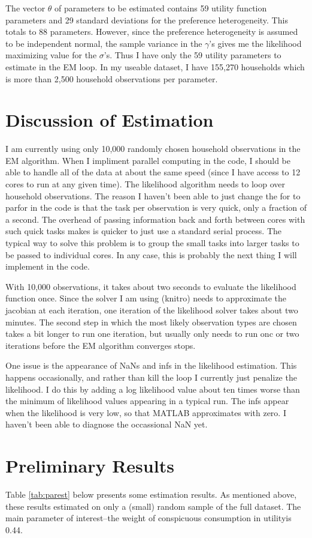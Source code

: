 \documentclass{article}
\begin{document}
The vector $\theta$ of parameters to be estimated contains 59 utility function parameters and 29 standard deviations for the preference heterogeneity.  
This totals to 88 parameters.  
However, since the preference heterogeneity is assumed to be independent normal, the sample variance in the $\gamma$'s gives me the likelihood maximizing value for the $\sigma$'s.
Thus I have only the 59 utility parameters to estimate in the EM loop. 
In my useable dataset, I have 155,270 households which is more than 2,500 household observations per parameter.
\section{Discussion of Estimation}
I am currently using only 10,000 randomly chosen household observations in the EM algorithm.
When I impliment parallel computing in the code, I should be able to handle all of the data at about the same speed (since I have access to 12 cores to run at any given time).
The likelihood algorithm needs to loop over household observations.
The reason I haven't been able to just change the for to parfor in the code is that the task per observation is very quick, only a fraction of a second.
The overhead of passing information back and forth between cores with such quick tasks makes is quicker to just use a standard serial process.
The typical way to solve this problem is to group the small tasks into larger tasks to be passed to individual cores.  
In any case, this is probably the next thing I will implement in the code.

With 10,000 observations, it takes about two seconds to evaluate the likelihood function once.
Since the solver I am using (knitro) needs to approximate the jacobian at each iteration, one iteration of the likelihood solver takes about two minutes.
The second step in which the most likely observation types are chosen takes a bit longer to run one iteration, but usually only needs to run onc or two iterations before the EM algorithm converges stops.

One issue is the appearance of NaNs and infs in the likelihood estimation. 
This happens occasionally, and rather than kill the loop I currently just penalize the likelihood.
I do this by adding a log likelihood value about ten times worse than the minimum of likelihood values appearing in a typical run.
The infs appear when the likelihood is very low, so that MATLAB approximates with zero.
I haven't been able to diagnose the occassional NaN yet.
\section{Preliminary Results}
Table \ref{tab:parest} below presents some estimation results.  
As mentioned above, these results estimated on only a (small) random sample of the full dataset.
The main parameter of interest--the weight of conspicuous consumption in utilityis 0.44.  
\end{document}
